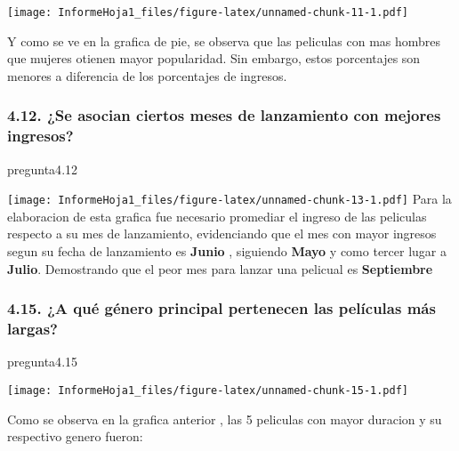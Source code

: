 \documentclass[
]{article}
\newenvironment{Shaded}{\begin{snugshade}}{\end{snugshade}}
\newcommand{\FloatTok}[1]{\textcolor[rgb]{0.00,0.00,0.81}{#1}}
\newcommand{\NormalTok}[1]{#1}
\begin{document}
\texttt{[image: InformeHoja1\_files/figure-latex/unnamed-chunk-11-1.pdf]}

Y como se ve en la grafica de pie, se observa que las peliculas con mas
hombres que mujeres otienen mayor popularidad. Sin embargo, estos
porcentajes son menores a diferencia de los porcentajes de ingresos.

\hypertarget{se-asocian-ciertos-meses-de-lanzamiento-con-mejores-ingresos}{%
\subsubsection{4.12. ¿Se asocian ciertos meses de lanzamiento con
mejores
ingresos?}\label{se-asocian-ciertos-meses-de-lanzamiento-con-mejores-ingresos}}

\begin{Shaded}
\begin{Highlighting}[]
\NormalTok{pregunta4}\FloatTok{.12}
\end{Highlighting}
\end{Shaded}

\texttt{[image: InformeHoja1\_files/figure-latex/unnamed-chunk-13-1.pdf]}
Para la elaboracion de esta grafica fue necesario promediar el ingreso
de las peliculas respecto a su mes de lanzamiento, evidenciando que el
mes con mayor ingresos segun su fecha de lanzamiento es \textbf{Junio} ,
siguiendo \textbf{Mayo} y como tercer lugar a \textbf{Julio}.
Demostrando que el peor mes para lanzar una pelicual es
\textbf{Septiembre}

\hypertarget{a-quuxe9-guxe9nero-principal-pertenecen-las-peluxedculas-muxe1s-largas}{%
\subsubsection{4.15. ¿A qué género principal pertenecen las películas
más
largas?}\label{a-quuxe9-guxe9nero-principal-pertenecen-las-peluxedculas-muxe1s-largas}}

\begin{Shaded}
\begin{Highlighting}[]
\NormalTok{pregunta4}\FloatTok{.15}
\end{Highlighting}
\end{Shaded}

\texttt{[image: InformeHoja1\_files/figure-latex/unnamed-chunk-15-1.pdf]}

Como se observa en la grafica anterior , las 5 peliculas con mayor
duracion y su respectivo genero fueron:
\end{document}
